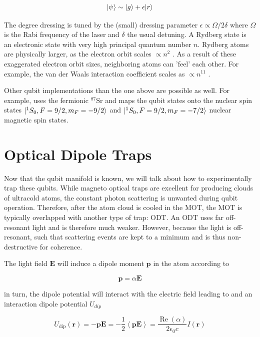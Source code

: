 \begin{equation}\label{eq:RydbergDressing}
	\lvert\psi\rangle \sim \lvert g\rangle + \epsilon \lvert r\rangle
\end{equation}

The degree dressing is tuned by the (small) dressing parameter $\epsilon \propto \Omega / 2\delta$ where $\Omega$ is the Rabi frequency of the laser and $\delta$ the usual detuning. A Rydberg state is an electronic state with very high principal quantum number $n$. Rydberg atoms are physically larger, as the electron orbit scales $\propto n^2$ \cite{Gallagher1994}. As a result of these exaggerated electron orbit sizes, neighboring atoms can 'feel' each other. For example, the van der Waals interaction coefficient scales as $\propto n^{11}$ \cite{Gallagher1994}. 

Other qubit implementations than the one above are possible as well. For example, \cite{Barnes2021} uses the fermionic ${}^{87}$Sr and maps the qubit states onto the nuclear spin states $\lvert{}^1S_0, F=9/2, m_F = -9/2\rangle$ and $\lvert{}^1S_0, F=9/2, m_F = -7/2\rangle$ nuclear magnetic spin states. 


\section{Optical Dipole Traps}\label{sec:OpticalDipoleTrap}

Now that the qubit manifold is known, we will talk about how to experimentally trap these qubits. While magneto optical traps are excellent for producing clouds of ultracold atoms, the constant photon scattering is unwanted during qubit operation. Therefore, after the atom cloud is cooled in the \ac{MOT}, the MOT is typically overlapped with another type of trap: \ac{ODT}. An ODT uses far off-resonant light and is therefore much weaker. However, because the light is off-resonant, such that scattering events are kept to a minimum and is thus non-destructive for coherence. 

The light field $\mathbf{E}$ will induce a dipole moment $\mathbf{p}$ in the atom according to 
	
\begin{equation}\label{eq:DipoleMoment}
	\mathbf{p} = \alpha \mathbf{E}
\end{equation}

in turn, the dipole potential will interact with the electric field leading to and an interaction dipole potential $U_{dip}$

\begin{equation}\label{eq:DipolePotential}
	U_{\text{dip}}(\mathbf{r}) = -\mathbf{p}\mathbf{E} = 
	-\frac{1}{2} \left\langle \mathbf{p}\mathbf{E} \right\rangle = \frac{\operatorname{Re}(\alpha)}{2\epsilon_0 c} I(\mathbf{r})
\end{equation}

